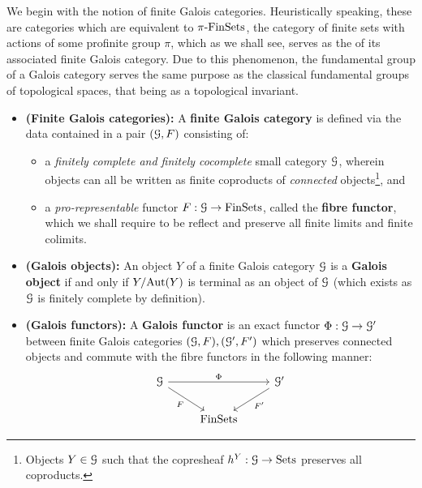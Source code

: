                 We begin with the notion of finite Galois categories. Heuristically speaking, these are categories which are equivalent to $\pi\text{-}\mathrm{Fin}\mathrm{Sets}$, the category of finite sets with actions of some profinite group $\pi$, which as we shall see, serves as the  of its associated finite Galois category. Due to this phenomenon, the fundamental group of a Galois category serves the same purpose as the classical fundamental groups of topological spaces, that being as a topological invariant. 
                \begin{definition} \label{def: finite_galois_categories}
                    \noindent
                    \begin{itemize}
                        \item \textbf{(Finite Galois categories):} A \textbf{finite Galois category} is defined via the data contained in a pair $(\mathcal{G}, F)$ consisting of:
                        \begin{itemize}
                            \item a \textit{finitely complete and finitely cocomplete} small category $\mathcal{G}$, wherein objects can all be written as finite coproducts of \textit{connected} objects\footnote{Objects $Y \in \mathcal{G}$ such that the copresheaf $h^Y: \mathcal{G} \to \mathrm{Sets}$ preserves all coproducts.}, and
                            \item a \textit{pro-representable} functor $F: \mathcal{G} \to \mathrm{Fin}\mathrm{Sets}$, called the \textbf{fibre functor}, which we shall require to be reflect and preserve all finite limits and finite colimits.
                        \end{itemize}
                        \item \textbf{(Galois objects):} An object $Y$ of a finite Galois category $\mathcal{G}$ is a \textbf{Galois object} if and only if $Y/\mathrm{Aut}(Y)$ is terminal as an object of $\mathcal{G}$ (which exists as $\mathcal{G}$ is finitely complete by definition).
                        \item \textbf{(Galois functors):} A \textbf{Galois functor} is an exact functor $\Phi: \mathcal{G} \to \mathcal{G}'$ between finite Galois categories $(\mathcal{G}, F), (\mathcal{G}', F')$ which preserves connected objects and commute with the fibre functors in the following manner:
                            $$
                                \begin{tikzcd}
                                	\calG && {\calG'} \\
                                	& \Fin\Sets
                                	\arrow["F"', from=1-1, to=2-2]
                                	\arrow["{F'}", from=1-3, to=2-2]
                                	\arrow["\Phi", from=1-1, to=1-3]
                                \end{tikzcd}
                            $$
                    \end{itemize}
                \end{definition}
